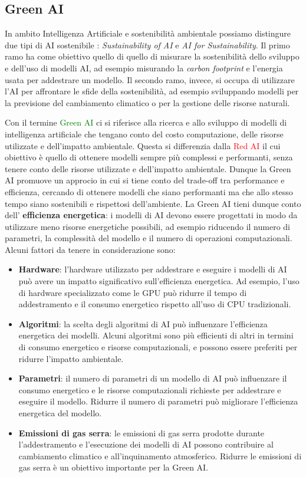 \subsection{Green AI}

In ambito Intelligenza Artificiale e sostenibilità ambientale possiamo distingure due tipi di AI sostenibile \cite{sostenibilita}: \textit{Sustainability of AI} e \textit{AI for Sustainability}. Il primo ramo ha come obiettivo quello di quello di misurare la sostenibilità dello sviluppo e dell'uso di modelli AI, ad esempio misurando la \textit{carbon footprint} e l'energia usata per addestrare un modello. Il secondo ramo, invece, si occupa di utilizzare l'AI per affrontare le sfide della sostenibilità, ad esempio sviluppando modelli per la previsione del cambiamento climatico o per la gestione delle risorse naturali.

\noindent Con il termine \textcolor{green}{Green AI} \cite{GreenAI} ci si riferisce alla ricerca e allo sviluppo di modelli di intelligenza artificiale che tengano conto del costo computazione, delle risorse utilizzate e dell'impatto ambientale. Questa si differenzia dalla \textcolor{red}{Red AI} il cui obiettivo è quello di ottenere modelli sempre più complessi e performanti, senza tenere conto delle risorse utilizzate e dell'impatto ambientale. Dunque la Green AI promuove un approcio in cui si tiene conto del trade-off tra performance e efficienza, cercando di ottenere modelli che siano performanti ma che allo stesso tempo siano sostenibili e rispettosi dell'ambiente.
La Green AI tieni dunque conto dell' \textbf{efficienza energetica}: i modelli di AI devono essere progettati in modo da utilizzare meno risorse energetiche possibili, ad esempio riducendo il numero di parametri, la complessità del modello e il numero di operazioni computazionali.
Alcuni fattori da tenere in considerazione sono:
\begin{itemize}
    \item \textbf{Hardware}: l'hardware utilizzato per addestrare e eseguire i modelli di AI può avere un impatto significativo sull'efficienza energetica. Ad esempio, l'uso di hardware specializzato come le GPU può ridurre il tempo di addestramento e il consumo energetico rispetto all'uso di CPU tradizionali.
    \item \textbf{Algoritmi}: la scelta degli algoritmi di AI può influenzare l'efficienza energetica dei modelli. Alcuni algoritmi sono più efficienti di altri in termini di consumo energetico e risorse computazionali, e possono essere preferiti per ridurre l'impatto ambientale.
    \item \textbf{Parametri}: il numero di parametri di un modello di AI può influenzare il consumo energetico e le risorse computazionali richieste per addestrare e eseguire il modello. Ridurre il numero di parametri può migliorare l'efficienza energetica del modello.
    \item \textbf{Emissioni di gas serra}: le emissioni di gas serra prodotte durante l'addestramento e l'esecuzione dei modelli di AI possono contribuire al cambiamento climatico e all'inquinamento atmosferico. Ridurre le emissioni di gas serra è un obiettivo importante per la Green AI.
\end{itemize}


